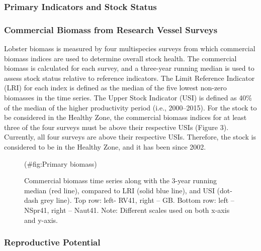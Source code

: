 \documentclass[11pt]{book}
\begin{document}
\hypertarget{primary-indicators-and-stock-status}{%
\subsubsection{Primary Indicators and Stock Status}\label{primary-indicators-and-stock-status}}

\hypertarget{commercial-biomass-from-research-vessel-surveys}{%
\subsubsection{Commercial Biomass from Research Vessel Surveys}\label{commercial-biomass-from-research-vessel-surveys}}

Lobster biomass is measured by four multispecies surveys from which commercial biomass indices are used to determine overall stock health. The commercial biomass is calculated for each survey, and a three-year running median is used to assess stock status relative to reference indicators. The Limit Reference Indicator (LRI) for each index is defined as the median of the five lowest non-zero biomasses in the time series. The Upper Stock Indicator (USI) is defined as 40\% of the median of the higher productivity period (i.e., 2000--2015). For the stock to be considered in the Healthy Zone, the commercial biomass indices for at least three of the four surveys must be above their respective USIs (Figure 3). Currently, all four surveys are above their respective USIs. Therefore, the stock is considered to be in the Healthy Zone, and it has been since 2002.
\begin{figure}[htb]

{\centering {} 

}

\caption{ Commercial biomass time series along with the 3-year running median (red line), compared to LRI (solid blue line), and  USI (dot-dash grey line). Top row: left- RV41, right – GB. Bottom row: left –NSpr41, right – Naut41. Note: Different scales used on both x-axis and y-axis.}(\#fig:Primary biomass)
\end{figure}
\hypertarget{reproductive-potential}{%
\subsubsection{Reproductive Potential}\label{reproductive-potential}}
\end{document}
